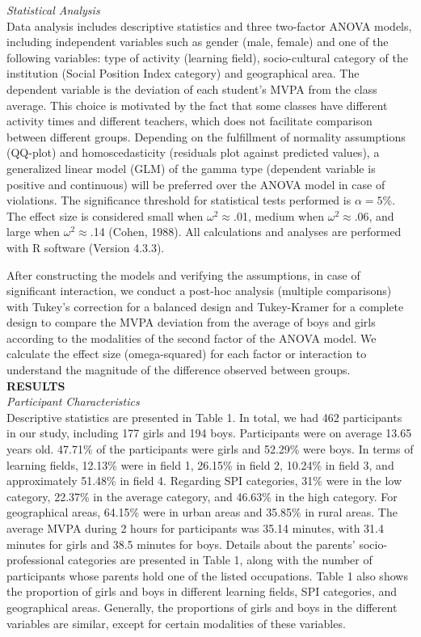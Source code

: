 \documentclass[12pt,a4paper]{article}
\begin{document}
	\textit{Statistical Analysis}\\
	Data analysis includes descriptive statistics and three two-factor ANOVA models, including independent variables such as gender (male, female) and one of the following variables: type of activity (learning field), socio-cultural category of the institution (Social Position Index category) and geographical area. The dependent variable is the deviation of each student's MVPA from the class average. This choice is motivated by the fact that some classes have different activity times and different teachers, which does not facilitate comparison between different groups. Depending on the fulfillment of normality assumptions (QQ-plot) and homoscedasticity (residuals plot against predicted values), a generalized linear model (GLM) of the gamma type (dependent variable is positive and continuous) will be preferred over the ANOVA model in case of violations. The significance threshold for statistical tests performed is $\alpha = 5\%$. The effect size is considered small when $\omega^2\approx$.01, medium when $\omega^2\approx$.06, and large when $\omega^2\approx$.14 (Cohen, 1988). All calculations and analyses are performed with R software (Version 4.3.3).
	
	After constructing the models and verifying the assumptions, in case of significant interaction, we conduct a post-hoc analysis (multiple comparisons) with Tukey's correction for a balanced design and Tukey-Kramer for a complete design to compare the MVPA deviation from the average of boys and girls according to the modalities of the second factor of the ANOVA model. We calculate the effect size (omega-squared) for each factor or interaction to understand the magnitude of the difference observed between groups.\\
	
	\textbf{RESULTS}\\
	
	\textit{Participant Characteristics}\\
	
	Descriptive statistics are presented in Table 1. In total, we had 462 participants in our study, including 177 girls and 194 boys. Participants were on average 13.65 years old. 47.71\% of the participants were girls and 52.29\% were boys. In terms of learning fields, 12.13\% were in field 1, 26.15\% in field 2, 10.24\% in field 3, and approximately 51.48\% in field 4. Regarding SPI categories, 31\% were in the low category, 22.37\% in the average category, and 46.63\% in the high category. For geographical areas, 64.15\% were in urban areas and 35.85\% in rural areas. The average MVPA during 2 hours for participants was 35.14 minutes, with 31.4 minutes for girls and 38.5 minutes for boys. Details about the parents' socio-professional categories are presented in Table 1, along with the number of participants whose parents hold one of the listed occupations. Table 1 also shows the proportion of girls and boys in different learning fields, SPI categories, and geographical areas. Generally, the proportions of girls and boys in the different variables are similar, except for certain modalities of these variables.
	
\end{document}
